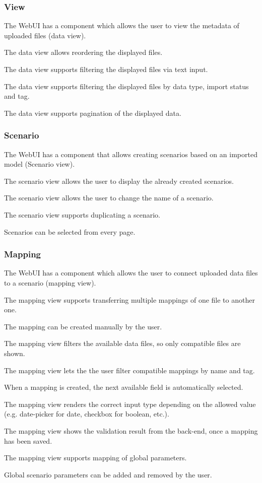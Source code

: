 \subsubsection{View}
\reqstartF
\item The WebUI has a component which allows the user to view the metadata of uploaded files (data view).
\item The data view allows reordering the displayed files.
\item The data view supports filtering the displayed files via text input.
\item The data view supports filtering the displayed files by data type, import status and tag.
\item The data view supports pagination of the displayed data.
\reqendF

\subsubsection{Scenario}
\reqstartF
\item The WebUI has a component that allows creating scenarios based on an imported model (Scenario view).
\item The scenario view allows the user to display the already created scenarios.
\item The scenario view allows the user to change the name of a scenario.
\item The scenario view supports duplicating a scenario.
\item Scenarios can be selected from every page.
\reqendF

\subsubsection{Mapping}
\reqstartF
\item The WebUI has a component which allows the user to connect uploaded data files to a scenario (mapping view).
\item The mapping view supports transferring multiple mappings of one file to another one.
\item The mapping can be created manually by the user.
\item The mapping view filters the available data files, so only compatible files are shown.
\item The mapping view lets the the user filter compatible mappings by name and tag.
\item When a mapping is created, the next available field is automatically selected.
\item The mapping view renders the correct input type depending on the allowed value (e.g. date-picker for date, checkbox for boolean, etc.).
\item The mapping view shows the validation result from the back-end, once a mapping has been saved.
\item The mapping view supports mapping of global parameters.
\item Global scenario parameters can be added and removed by the user.
\reqendF


